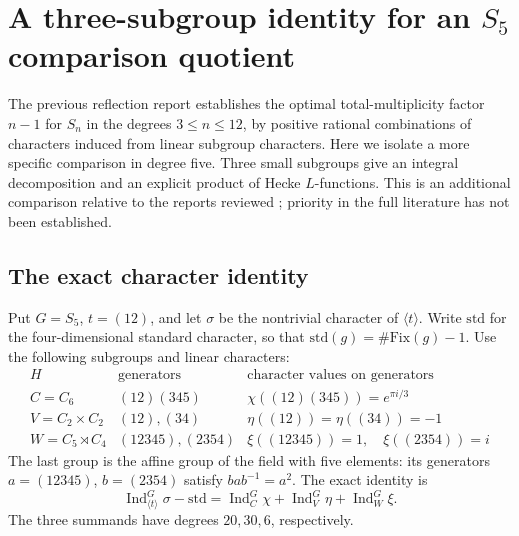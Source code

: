 \section{A three-subgroup identity for an \texorpdfstring{$S_5$}{S5} comparison quotient}
\label{sec:sn5-identity}

The previous reflection report establishes the optimal total-multiplicity
factor $n-1$ for $S_n$ in the degrees $3\leq n\leq12$, by positive rational
combinations of characters induced from linear subgroup characters.
Here we isolate a more specific comparison in degree five. Three small
subgroups give an integral decomposition and an explicit product of
Hecke $L$-functions. This is an additional comparison relative to the
reports reviewed \cite{priorreflection}; priority in the full literature has not been established.

\subsection{The exact character identity}

Put $G=S_5$, $t=(12)$, and let $\sigma$ be the nontrivial character of
$\langle t\rangle$. Write $\mathrm{std}$ for the four-dimensional standard
character, so that $\mathrm{std}(g)=\#\mathrm{Fix}(g)-1$.
Use the following subgroups and linear characters:
\[
\begin{array}{c|c|c}
H&\text{generators}&\text{character values on generators}\\ \hline
C=C_6 &(12)(345)&\chi((12)(345))=e^{\pi i/3}\\
V=C_2\times C_2 &(12),(34)&\eta((12))=\eta((34))=-1\\
W=C_5\rtimes C_4 &(12345),(2354)&\xi((12345))=1,\quad\xi((2354))=i
\end{array}
\]
The last group is the affine group of the field with five elements:
its generators $a=(12345)$, $b=(2354)$ satisfy $bab^{-1}=a^2$.
The exact identity is
\begin{equation}
 \operatorname{Ind}_{\langle t\rangle}^{G}\sigma-\mathrm{std}
 =\operatorname{Ind}_{C}^{G}\chi
  +\operatorname{Ind}_{V}^{G}\eta
  +\operatorname{Ind}_{W}^{G}\xi .
\label{eq:v5-identity}
\end{equation}
The three summands have degrees $20,30,6$, respectively.

